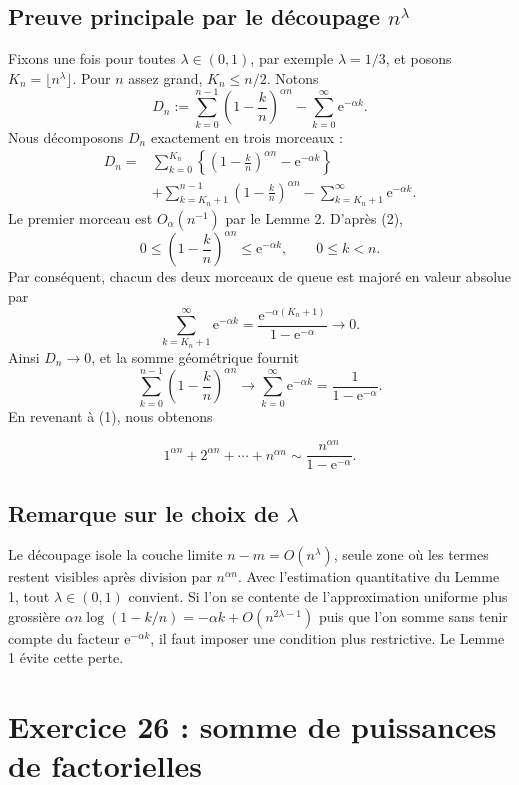 \documentclass[11pt,a4paper]{article}
\newcommand{\e}{\mathrm e}
\begin{document}
\subsection{Preuve principale par le d\'ecoupage $n^\lambda$}
Fixons une fois pour toutes $\lambda\in(0,1)$, par exemple $\lambda=1/3$, et
posons $K_n=\lfloor n^\lambda\rfloor$. Pour $n$ assez grand, $K_n\leq n/2$.
Notons
\[
 D_n:=\sum_{k=0}^{n-1}\left(1-\frac{k}{n}\right)^{\alpha n}
       -\sum_{k=0}^{\infty}\e^{-\alpha k}.
\]
Nous d\'ecomposons $D_n$ exactement en trois morceaux :
\begin{align*}
D_n={}&\sum_{k=0}^{K_n}
 \left\{\left(1-\frac{k}{n}\right)^{\alpha n}-\e^{-\alpha k}\right\}\\
&+\sum_{k=K_n+1}^{n-1}\left(1-\frac{k}{n}\right)^{\alpha n}
-\sum_{k=K_n+1}^{\infty}\e^{-\alpha k}.
\end{align*}
Le premier morceau est $O_\alpha(n^{-1})$ par le Lemme 2. D'apr\`es (2),
\[
 0\leq\left(1-\frac{k}{n}\right)^{\alpha n}\leq\e^{-\alpha k},
 \qquad 0\leq k<n.
\]
Par cons\'equent, chacun des deux morceaux de queue est major\'e en valeur
absolue par
\[
 \sum_{k=K_n+1}^{\infty}\e^{-\alpha k}
 =\frac{\e^{-\alpha(K_n+1)}}{1-\e^{-\alpha}}\longrightarrow0.
\]
Ainsi $D_n\to0$, et la somme g\'eom\'etrique fournit
\[
 \sum_{k=0}^{n-1}\left(1-\frac{k}{n}\right)^{\alpha n}
 \longrightarrow\sum_{k=0}^{\infty}\e^{-\alpha k}
 =\frac1{1-\e^{-\alpha}}.
\]
En revenant \`a (1), nous obtenons
\begin{resultbox}
\[
 \boxed{\displaystyle
 1^{\alpha n}+2^{\alpha n}+\cdots+n^{\alpha n}
 \sim\frac{n^{\alpha n}}{1-\e^{-\alpha}}.}
\]
\end{resultbox}

\subsection{Remarque sur le choix de $\lambda$}
\begin{remarkbox}
Le d\'ecoupage isole la couche limite $n-m=O(n^\lambda)$, seule zone o\`u les
termes restent visibles apr\`es division par $n^{\alpha n}$. Avec l'estimation
quantitative du Lemme 1, tout $\lambda\in(0,1)$ convient. Si l'on se contente
de l'approximation uniforme plus grossi\`ere
$\alpha n\log(1-k/n)=-\alpha k+O(n^{2\lambda-1})$ puis que l'on somme sans
tenir compte du facteur $\e^{-\alpha k}$, il faut imposer une condition plus
restrictive. Le Lemme 1 \'evite cette perte.
\end{remarkbox}

\section{Exercice 26 : somme de puissances de factorielles}
\end{document}
